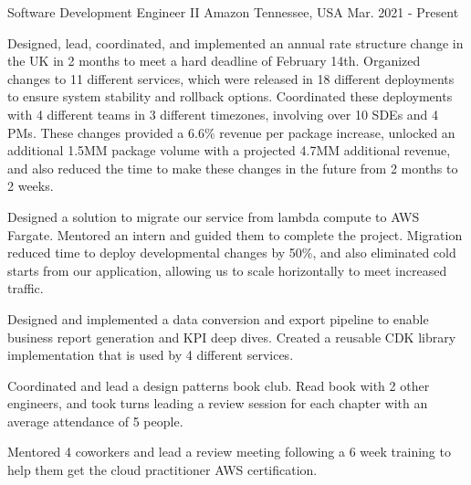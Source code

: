 

\begin{cventries}

  \cventry
    {Software Development Engineer II} %
    {Amazon} %
    {Tennessee, USA} %
    {Mar. 2021 - Present} %
    {
      \begin{cvitems} %
        \item {Designed, lead, coordinated, and implemented an annual rate structure change in the UK in 2 months to meet a hard deadline of February 14th. Organized changes to 11 different services, which were released in 18 different deployments to ensure system stability and rollback options. Coordinated these deployments with 4 different teams in 3 different timezones, involving over 10 SDEs and 4 PMs. These changes provided a 6.6\% revenue per package increase, unlocked an additional 1.5MM package volume with a projected 4.7MM additional revenue, and also reduced the time to make these changes in the future from 2 months to 2 weeks.}
        \item {Designed a solution to migrate our service from lambda compute to AWS Fargate. Mentored an intern and guided them to complete the project. Migration reduced time to deploy developmental changes by 50\%, and also eliminated cold starts from our application, allowing us to scale horizontally to meet increased traffic.}
        \item {Designed and implemented a data conversion and export pipeline to enable business report generation and KPI deep dives. Created a reusable CDK library implementation that is used by 4 different services.}
        \item {Coordinated and lead a design patterns book club. Read book with 2 other engineers, and took turns leading a review session for each chapter with an average attendance of 5 people.}
        \item {Mentored 4 coworkers and lead a review meeting following a 6 week training to help them get the cloud practitioner AWS certification.}
      \end{cvitems}
    }


\end{cventries}

